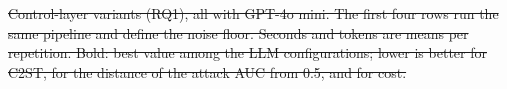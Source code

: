 \documentclass[conference]{IEEEtran}
\newcommand{\system}{\textsc{Synthagent}\xspace}
\newcommand{\best}[1]{\textbf{#1}}
\providecommand{\DIFdeltex}[1]{{\protect\color{red}\sout{#1}}}                      %
\providecommand{\DIFdelFL}[1]{\DIFdel{#1}} %
\providecommand{\DIFdel}[1]{\texorpdfstring{\DIFdeltex{#1}}{}} %
\begin{document}
{%
\DIFdelFL{Control-layer variants (RQ1), all with GPT-4o mini. The first four rows run the same pipeline and define the noise floor. Seconds and tokens are means per repetition. Bold: best value among the LLM configurations; lower is better for C2ST, for the distance of the attack AUC from 0.5, and for cost.}}
\end{document}

